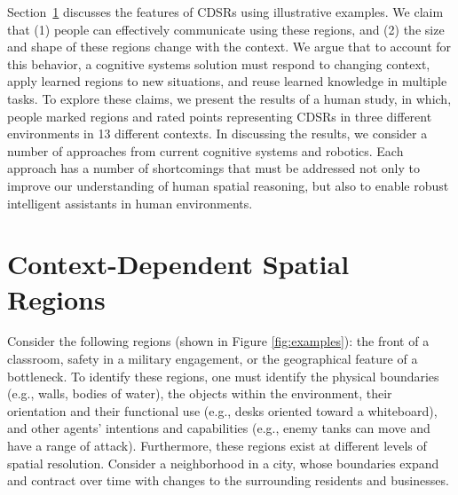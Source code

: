 \documentclass[11pt,letterpaper]{article}
\begin{document}
Section~\ref{sec:cdsrs} discusses the features of CDSRs using illustrative examples.  We claim that (1) people can effectively communicate using these regions, and (2) the size and shape of these regions change with the context.  We argue that to account for this behavior, a cognitive systems solution must respond to changing context, apply learned regions to new situations, and reuse learned knowledge in multiple tasks.  To explore these claims, we present the results of a human study, in which, people marked regions and rated points representing CDSRs in three different environments in 13 different contexts.  In discussing the results, we consider a number of approaches from current cognitive systems and robotics.  Each approach has a number of shortcomings that must be addressed not only to improve our understanding of human spatial reasoning, but also to enable robust intelligent assistants in human environments.

\section{Context-Dependent Spatial Regions}\label{sec:cdsrs}

Consider the following regions (shown in Figure \ref{fig:examples}): the front of a classroom, safety in a military engagement, or the geographical feature of a bottleneck.  To identify these regions, one must identify the physical boundaries (e.g., walls, bodies of water), the objects within the environment, their orientation and their functional use (e.g., desks oriented toward a whiteboard), and other agents' intentions and capabilities (e.g., enemy tanks can move and have a range of attack).  Furthermore, these regions exist at different levels of spatial resolution.  Consider a neighborhood in a city, whose boundaries expand and contract over time with changes to the surrounding residents and businesses.
\end{document}

